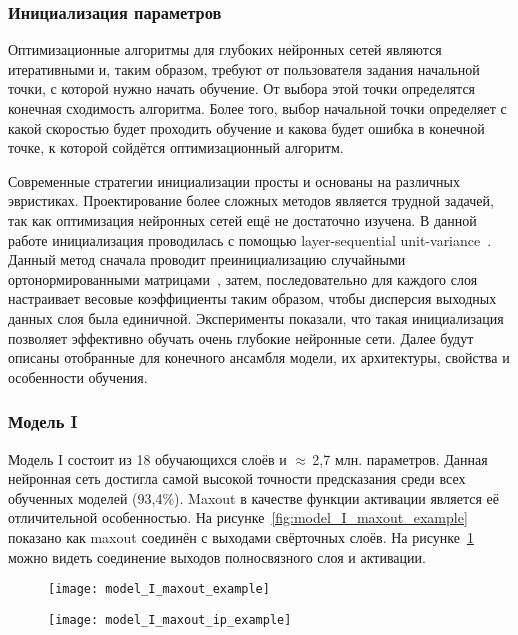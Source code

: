 \subsubsection{Инициализация параметров}
Оптимизационные алгоритмы для глубоких нейронных сетей являются итеративными и, таким образом, требуют
от пользователя задания начальной точки, с которой нужно начать обучение. От выбора этой точки определятся
конечная сходимость алгоритма. Более того, выбор начальной точки определяет с какой скоростью
будет проходить обучение и какова будет ошибка в конечной точке, к которой сойдётся оптимизационный алгоритм.

Современные стратегии инициализации просты и основаны на различных эвристиках. Проектирование более сложных методов
является трудной задачей, так как оптимизация нейронных сетей ещё не достаточно изучена. В данной работе инициализация
проводилась с помощью layer-sequential unit-variance~\cite{DBLP:journals/corr/MishkinM15}.
Данный метод сначала проводит преинициализацию случайными ортонормированными матрицами~\cite{DBLP:journals/corr/SaxeMG13},
затем, последовательно для каждого слоя настраивает весовые коэффициенты таким образом, чтобы дисперсия
выходных данных слоя была единичной. Эксперименты показали, что такая инициализация позволяет эффективно 
обучать очень глубокие нейронные сети. Далее будут описаны отобранные для конечного ансамбля модели, их архитектуры, 
свойства и особенности обучения.

\subsubsection{Модель I}
Модель I состоит из 18 обучающихся слоёв и $\approx$\,2,7 млн. параметров.
Данная нейронная сеть достигла самой высокой точности предсказания среди всех обученных моделей (93,4\%). 
Maxout в качестве функции активации является её отличительной особенностью.
На рисунке~\ref{fig:model_I_maxout_example} показано как maxout соединён с выходами свёрточных слоёв. На
рисунке~\ref{fig:model_I_maxout_ip_example} можно видеть соединение выходов полносвязного слоя и активации.

\begin{figure}[H]
\centering
\begin{minipage}{.5\textwidth}
  \centering
  \texttt{[image: model\_I\_maxout\_example]}
  \label{fig:model_I_maxout_example}
\end{minipage}%
\begin{minipage}{.5\textwidth}
  \centering
  \texttt{[image: model\_I\_maxout\_ip\_example]}
  \label{fig:model_I_maxout_ip_example}
  \vspace*{1.4cm}
\end{minipage}
\vspace*{-1.4cm}
\end{figure}

